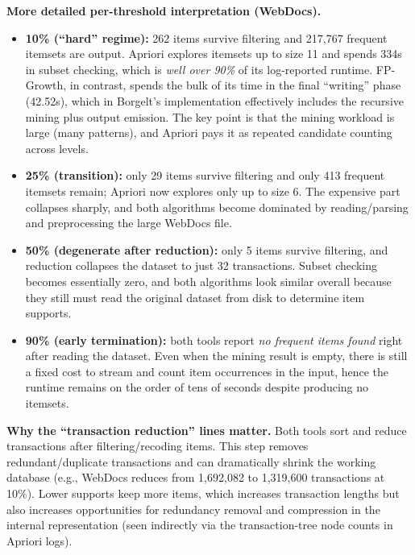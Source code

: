 \documentclass[11pt]{article}
\begin{document}
\noindent\textbf{More detailed per-threshold interpretation (WebDocs).}
\begin{itemize}
    \item \textbf{10\% (``hard'' regime):} 262 items survive filtering and 217,767 frequent itemsets are output. Apriori explores itemsets up to size 11 and spends 334s in subset checking, which is \emph{well over 90\%} of its log-reported runtime. FP-Growth, in contrast, spends the bulk of its time in the final ``writing'' phase (42.52s), which in Borgelt's implementation effectively includes the recursive mining plus output emission. The key point is that the mining workload is large (many patterns), and Apriori pays it as repeated candidate counting across levels.
    
    \item \textbf{25\% (transition):} only 29 items survive filtering and only 413 frequent itemsets remain; Apriori now explores only up to size 6. The expensive part collapses sharply, and both algorithms become dominated by reading/parsing and preprocessing the large WebDocs file.

    \item \textbf{50\% (degenerate after reduction):} only 5 items survive filtering, and reduction collapses the dataset to just 32 transactions. Subset checking becomes essentially zero, and both algorithms look similar overall because they still must read the original dataset from disk to determine item supports.

    \item \textbf{90\% (early termination):} both tools report \emph{no frequent items found} right after reading the dataset. Even when the mining result is empty, there is still a fixed cost to stream and count item occurrences in the input, hence the runtime remains on the order of tens of seconds despite producing no itemsets.
\end{itemize}

\noindent\textbf{Why the ``transaction reduction'' lines matter.} Both tools sort and reduce transactions after filtering/recoding items. This step removes redundant/duplicate transactions and can dramatically shrink the working database (e.g., WebDocs reduces from 1,692,082 to 1,319,600 transactions at 10\%). Lower supports keep more items, which increases transaction lengths but also increases opportunities for redundancy removal and compression in the internal representation (seen indirectly via the transaction-tree node counts in Apriori logs).
\end{document}

